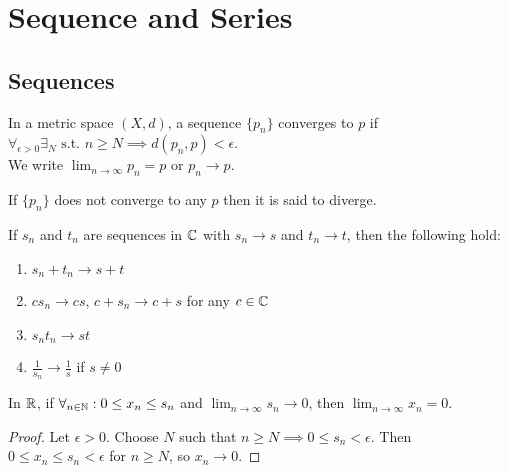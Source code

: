 \chapter{Sequence and Series}

\section{Sequences}

\begin{definition}
	In a metric space $(X,d)$, a sequence $\{p_n\}$ converges to $p$ if $\forall_{\epsilon>0}\exists_{N} \text{ s.t. } n\ge N \implies d(p_n,p)<\epsilon$.\\
	We write $\lim_{n\to\infty} p_n = p$ or $p_n \to p$.
\end{definition}


If $\{p_n\}$ does not converge to any $p$ then it is said to diverge.






\begin{theorem}
	\label{thm:3.3}
	If ${s}_{n}$ and ${t}_{n}$ are sequences in $\mathbb{C}$ with ${s}_{n} \to s$ and ${t}_{n} \to t$, then the following hold:
	\begin{enumerate}
		\item ${s}_{n} + {t}_{n} \to s + t$
		\item $c s_n \to cs$, $c+s_n\to c+s$ for any $c\in \mathbb{C}$
		\item $s_n t_n\to st$
		\item $\frac{1}{s_n}\to \frac{1}{s}$ if $s\neq 0$
	\end{enumerate}
\end{theorem}

\begin{lemma}
	\label{lem:3.4}
	In $\mathbb{R}$, if $\forall_{n \in \mathbb{N}}: 0 \le x_n \le s_n$ and $\lim_{n\to \infty }s_n \to 0$, then $\lim_{n\to \infty} x_n = 0$.
	\begin{proof}
		Let $\epsilon > 0$. Choose $N$ such that $n\ge N \implies 0\le s_n < \epsilon$. Then $0 \le x_n \le s_n < \epsilon$ for $n\ge N$, so $x_n \to 0$.
	\end{proof}
\end{lemma}

